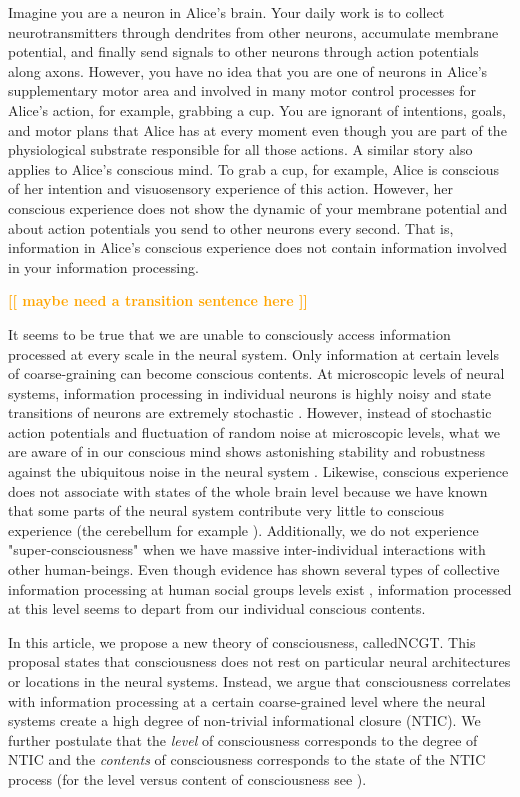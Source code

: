 \documentclass[utf8]{article}
\newcommand{\tname}{NCGT} 	%
\newcommand{\toWrite}[1]{\noindent
			\textcolor{Orange}{\textbf{[[ #1 ]]}}}
\begin{document}
		Imagine you are a neuron in Alice's brain. Your daily work is to collect neurotransmitters through dendrites from other neurons, accumulate membrane potential, and finally send signals to other neurons through action potentials along axons. However, you have no idea that you are one of neurons in Alice's supplementary motor area and involved in many motor control processes for Alice's action, for example, grabbing a cup. You are ignorant of intentions, goals, and motor plans that Alice has at every moment even though you are part of the physiological substrate responsible for all those actions.
		A similar story also applies to Alice's conscious mind. To grab a cup, for example, Alice is conscious of her intention and visuosensory experience of this action. However, her conscious experience does not show the dynamic of your membrane potential and about action potentials you send to other neurons every second. That is, information in Alice's conscious experience does not contain information involved in your information processing. 
			
		\toWrite{maybe need a transition sentence here}
		
		It seems to be true that we are unable to consciously access information processed at every scale in the neural system. Only information at certain levels of coarse-graining can become conscious contents. At microscopic levels of neural systems, information processing in individual neurons is highly noisy and state transitions of neurons are extremely stochastic \citep{Goldwyn2011, White2000}. However, instead of stochastic action potentials and fluctuation of random noise at microscopic levels, what we are aware of in our conscious mind shows astonishing stability and robustness against the ubiquitous noise in the neural system \citep{mathis1995computational}. Likewise, conscious experience does not associate with states of the whole brain level because we have known that some parts of the neural system contribute very little to conscious experience (the cerebellum for example \citep{lemon2010life}). Additionally, we do not  experience "super-consciousness" when we have massive inter-individual interactions with other human-beings. Even though evidence has shown several types of collective information processing at human social groups levels exist \citep{malone2015handbook}, information processed at this level seems to depart from our individual conscious contents.
		
		
		In this article, we propose a new theory of consciousness, called\ac{\tname}. This proposal states that consciousness does not rest on particular neural architectures or locations in the neural systems. Instead, we argue that consciousness correlates with information processing at a certain coarse-grained level where the neural systems create a high degree of non-trivial informational closure (NTIC). We further postulate that the \textit{level} of consciousness corresponds to the degree of NTIC and the \textit{contents} of consciousness corresponds to the state of the NTIC process (for the level versus content of consciousness see \cite{laureys2005neural, overgaard2010neural}).
			
\end{document}
